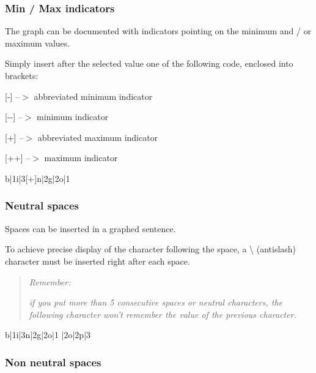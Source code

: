 \subsubsection*{Min / Max indicators}

The graph can be documented with indicators pointing on the minimum and / or maximum values.

Simply insert after the selected value one of the following code, enclosed into brackets\+:

{\ttfamily \mbox{[}-\/\mbox{]}} --$>$ abbreviated minimum indicator

{\ttfamily \mbox{[}-\/-\/\mbox{]}} --$>$ minimum indicator

{\ttfamily \mbox{[}+\mbox{]}} --$>$ abbreviated maximum indicator

{\ttfamily \mbox{[}++\mbox{]}} --$>$ maximum indicator


\begin{DoxyPre}{\ttfamily b|1i|3[+]n|2g|2o|1}\end{DoxyPre}




\subsubsection*{Neutral spaces}

Spaces can be inserted in a graphed sentence.

To achieve precise display of the character following the space, a {\ttfamily \textbackslash{}} (antislash) character must be inserted right after each space.

\begin{quote}
{\itshape Remember\+:}


\begin{DoxyItemize}
\item {\itshape if you put more than 5 consecutive spaces or neutral characters, the following character won’t remember the value of the previous character.} 
\end{DoxyItemize}\end{quote}



\begin{DoxyPre}{\ttfamily b|1i|3n|2g|2o|1 |2o|2p|3}\end{DoxyPre}




\subsubsection*{Non neutral spaces}

